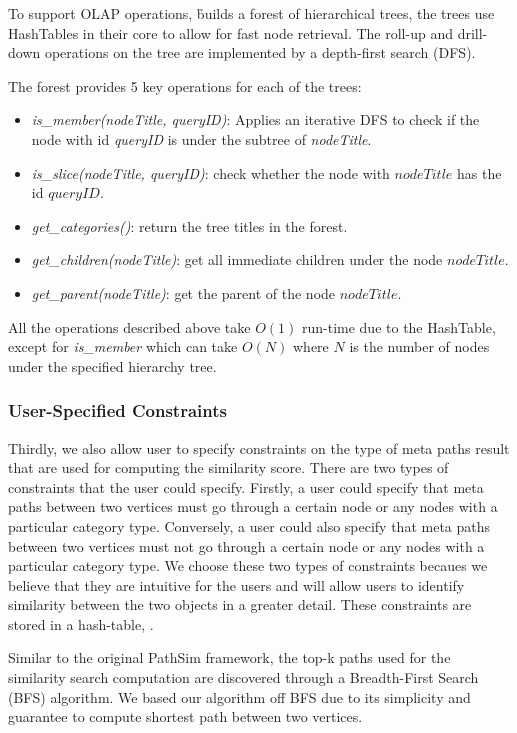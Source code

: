To support OLAP operations,
\h builds a forest of hierarchical trees, the trees use HashTables in their core to
allow for fast node retrieval. The roll-up and drill-down operations
on the tree are implemented by a depth-first search (DFS).

The forest provides 5 key operations for each of the trees:
\begin{itemize}
    \item \textit{is\_member(nodeTitle, queryID)}: Applies an iterative DFS to check if
    the node with id \textit{queryID} is under the subtree of \textit{nodeTitle}.
    \item \textit{is\_slice(nodeTitle, queryID)}: check whether the node with $nodeTitle$
    has the id $queryID$.
    \item \textit{get\_categories()}: return the tree titles in the forest.
    \item \textit{get\_children(nodeTitle)}: get all immediate children under the node
    $nodeTitle$.
    \item \textit{get\_parent(nodeTitle)}: get the parent of the node $nodeTitle$.
\end{itemize}

All the operations described above take $O(1)$ run-time due to the HashTable, except for
\textit{is\_member} which can take $O(N)$ where $N$ is the number of nodes under the specified
hierarchy tree.

\subsubsection{User-Specified Constraints}
\label{sec:user_constraint}

Thirdly, we also allow user to specify constraints on the type of meta paths
result that are used for computing the similarity score. There are two types of
constraints that the user could specify. Firstly, a user could specify that
meta paths between two vertices must go through a certain node or any nodes
with a particular category type. Conversely,  a user could also specify that
meta paths between two vertices must not go through a certain node or any nodes
with a particular category type. We choose these two types of constraints
becaues we believe that they are intuitive for the users and will allow users
to identify similarity between the two objects in a greater detail. These
constraints are stored in a hash-table, \cTable.

Similar to the original PathSim framework, the top-k paths used for the
similarity search computation are discovered through a Breadth-First Search
(BFS) algorithm. We based our algorithm off BFS due to its simplicity and guarantee to
compute shortest path between two vertices.

